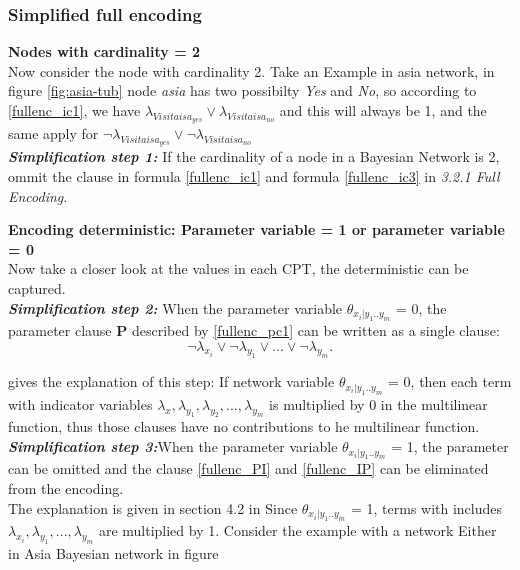        \subsubsection{Simplified full encoding}
        \textbf{Nodes with cardinality = 2}\\
        Now consider the node with cardinality 2. Take an Example in asia network, in figure \ref{fig:asia-tub} node \textit{asia} has two possibilty \textit{Yes} and \textit{No}, so according to \ref{fullenc_ic1}, we have $\lambda_{Visitaisa_{yes}} \vee \lambda_{Visitaisa_{no}}$ and this will always be 1, and the same apply for $\neg\lambda_{Visitaisa_{yes}} \vee \neg\lambda_{Visitaisa_{no}}$ \\
        \newline
        \noindent \textit{\textbf{Simplification step 1:}} If the cardinality of a node in a Bayesian Network is 2, ommit the clause in formula \ref{fullenc_ic1} and formula \ref{fullenc_ic3} in \textit{3.2.1 Full Encoding}.
        \newline
        
        \textbf{Encoding deterministic: Parameter variable = 1 or parameter variable = 0}\\
        Now take a closer look at the values in each CPT, the deterministic can be captured.\\
        
        \noindent \textit{\textbf{Simplification step 2:}} When the parameter variable $\theta_{x_{i}|y_{1}..y_{m}}$ = 0, the parameter clause \textbf{P} described by \ref{fullenc_pc1} can be written as a single clause: $$\neg\lambda_{x_{i}} \vee \neg\lambda_{y_{1}} \vee... \vee \neg\lambda_{y_{m}}.$$
        
        \cite{enc1} gives the explanation of this step: If network variable $\theta_{x_{i}|y_{1}..y_{m}}$ = 0, then each term with indicator variables $\lambda_{x}, \lambda_{y_{1}}, \lambda_{y_{2}}, ..., \lambda_{y_{m}}$ is multiplied by 0 in the multi\-linear function, thus those clauses have no contributions to he multi\-linear function.\\
        \newline
        \noindent \textit{\textbf{Simplification step 3:}}When the parameter variable $\theta_{x_{i}|y_{1}..y_{m}}$ = 1, the parameter can be omitted and the clause \ref{fullenc_PI} and \ref{fullenc_IP} can be eliminated from the encoding.\\
        
        The explanation is given in section 4.2 in \cite{enc1} 
        Since $\theta_{x_{i}|y_{1}..y_{m}}$ = 1, terms with includes $\lambda_{x_{i}}, \lambda_{y_{1}}, ..., \lambda_{y_{m}}$ are multiplied by 1. 
        Consider the example with a network Either in Asia Bayesian network in figure
        
